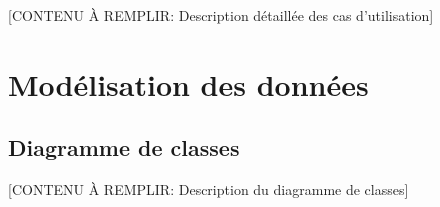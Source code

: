 [CONTENU À REMPLIR: Description détaillée des cas d'utilisation]

% 

\section{Modélisation des données}


\subsection{Diagramme de classes}


[CONTENU À REMPLIR: Description du diagramme de classes]


